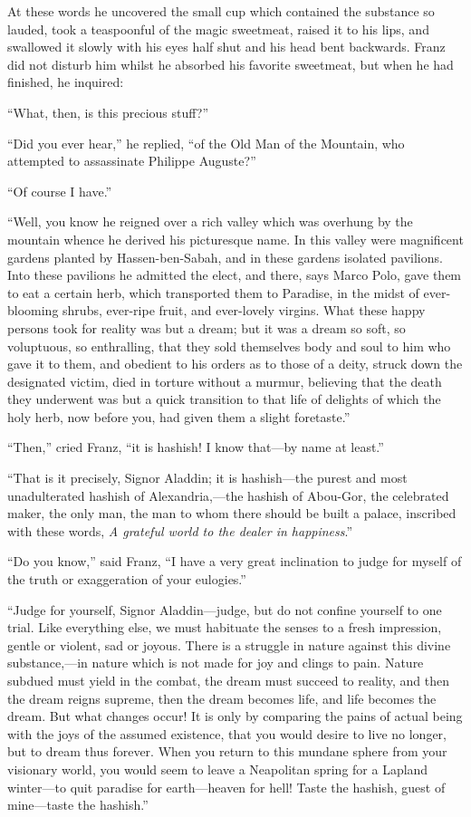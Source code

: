 At these words he uncovered the small cup which contained the substance
so lauded, took a teaspoonful of the magic sweetmeat, raised it to his
lips, and swallowed it slowly with his eyes half shut and his head bent
backwards. Franz did not disturb him whilst he absorbed his favorite
sweetmeat, but when he had finished, he inquired:

“What, then, is this precious stuff?”

“Did you ever hear,” he replied, “of the Old Man of the Mountain, who
attempted to assassinate Philippe Auguste?”

“Of course I have.”

“Well, you know he reigned over a rich valley which was overhung by the
mountain whence he derived his picturesque name. In this valley were
magnificent gardens planted by Hassen-ben-Sabah, and in these gardens
isolated pavilions. Into these pavilions he admitted the elect, and
there, says Marco Polo, gave them to eat a certain herb, which
transported them to Paradise, in the midst of ever-blooming shrubs,
ever-ripe fruit, and ever-lovely virgins. What these happy persons took
for reality was but a dream; but it was a dream so soft, so voluptuous,
so enthralling, that they sold themselves body and soul to him who gave
it to them, and obedient to his orders as to those of a deity, struck
down the designated victim, died in torture without a murmur, believing
that the death they underwent was but a quick transition to that life
of delights of which the holy herb, now before you, had given them a
slight foretaste.”

“Then,” cried Franz, “it is hashish! I know that—by name at least.”

“That is it precisely, Signor Aladdin; it is hashish—the purest and
most unadulterated hashish of Alexandria,—the hashish of Abou-Gor, the
celebrated maker, the only man, the man to whom there should be built a
palace, inscribed with these words, \textit{A grateful world to the dealer in
happiness}.”

“Do you know,” said Franz, “I have a very great inclination to judge
for myself of the truth or exaggeration of your eulogies.”

“Judge for yourself, Signor Aladdin—judge, but do not confine yourself
to one trial. Like everything else, we must habituate the senses to a
fresh impression, gentle or violent, sad or joyous. There is a struggle
in nature against this divine substance,—in nature which is not made
for joy and clings to pain. Nature subdued must yield in the combat,
the dream must succeed to reality, and then the dream reigns supreme,
then the dream becomes life, and life becomes the dream. But what
changes occur! It is only by comparing the pains of actual being with
the joys of the assumed existence, that you would desire to live no
longer, but to dream thus forever. When you return to this mundane
sphere from your visionary world, you would seem to leave a Neapolitan
spring for a Lapland winter—to quit paradise for earth—heaven for hell!
Taste the hashish, guest of mine—taste the hashish.”

